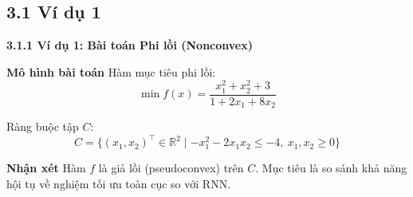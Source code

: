 \subsection{3.1 Ví dụ 1}
\begin{frame}{\textbf{\large 3.1.1 Ví dụ 1: Bài toán Phi lồi (Nonconvex)}}
    \vspace*{-1cm} %
    
    \begin{block}{\textbf{Mô hình bài toán}}
        \small
        Hàm mục tiêu phi lồi:
        $$ \min f(x) = \frac{x_{1}^{2}+x_{2}^{2}+3}{1+2x_{1}+8x_{2}} $$
        
        Ràng buộc tập $C$:
        $$ C = \{(x_1, x_2)^\top \in \mathbb{R}^2 \mid -x_1^2 - 2x_1x_2 \le -4, \ x_1, x_2 \ge 0\} $$
    \end{block}

    \begin{alertblock}{\textbf{Nhận xét}}
        \small
        Hàm $f$ là giả lồi (pseudoconvex) trên $C$. Mục tiêu là so sánh khả năng hội tụ về nghiệm tối ưu toàn cục so với RNN.
    \end{alertblock}
\end{frame}



